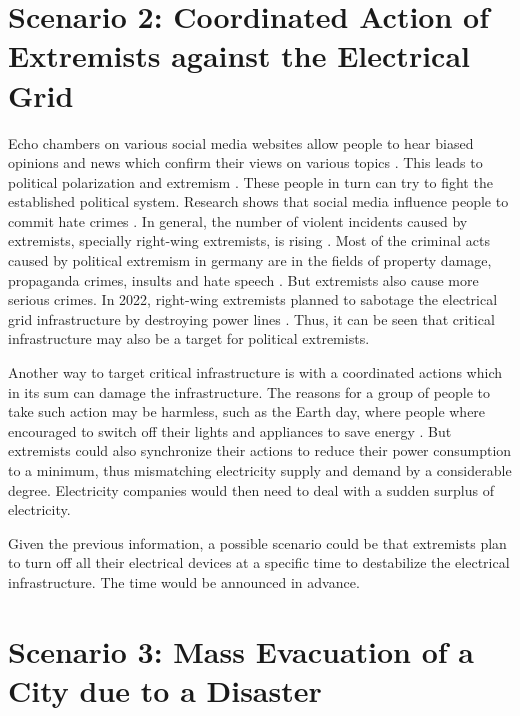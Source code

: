 \section{Scenario 2: Coordinated Action of Extremists 
against the Electrical Grid}

Echo chambers on various social media websites allow people to 
hear biased opinions and news which confirm their views on 
various topics \cite{terren2021echo}. This leads to political
polarization and extremism \cite{van2022banality}.
These people in turn can try to fight the established political
system. Research shows that social media influence people
to commit hate crimes \cite{muller2021fanning}.
In general, the number of violent incidents caused by
extremists, specially right-wing extremists, is rising 
\cite{koehler2016right}. 
Most of the criminal acts caused by political extremism 
in germany are in the fields of property damage, 
propaganda crimes, insults and hate speech \cite{bmicrimestatistics}.
But extremists also cause more serious crimes. In 2022,
right-wing extremists planned to sabotage the electrical grid 
infrastructure by destroying power lines \cite{anschlagstrom}.
Thus, it can be seen that critical infrastructure may also be a target
for political extremists. 

Another way to target critical infrastructure is with a coordinated
actions which in its sum can damage the infrastructure. The 
reasons for a group of people to take such action may be harmless,
such as the Earth day, where people where encouraged to switch off their 
lights and appliances to save energy \cite{earthday}.
But extremists could also synchronize their actions to reduce their
power consumption to a minimum, thus mismatching electricity supply
and demand by a considerable degree. Electricity companies would 
then need to deal with a sudden surplus of electricity.

Given the previous information, a possible scenario could be 
that extremists plan to turn off all their electrical devices at 
a specific time to destabilize the electrical infrastructure. The
time would be announced in advance.


\section{Scenario 3: Mass Evacuation of a City due to a Disaster}

